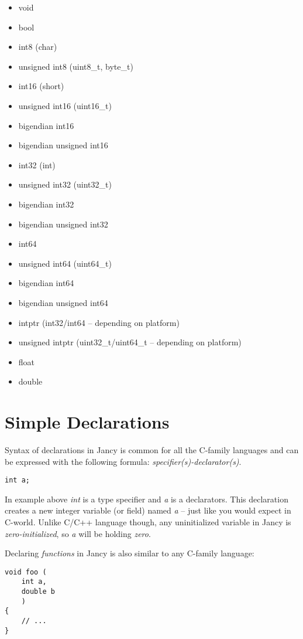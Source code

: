 \documentclass[oneside]{book}
\begin{document}
\begin{itemize}
\item void
\item bool
\item int8 (char)
\item unsigned int8 (uint8\_t, byte\_t)
\item int16 (short)
\item unsigned int16 (uint16\_t)
\item bigendian int16
\item bigendian unsigned int16 
\item int32 (int)
\item unsigned int32 (uint32\_t)
\item bigendian int32
\item bigendian unsigned int32
\item int64
\item unsigned int64 (uint64\_t)
\item bigendian int64
\item bigendian unsigned int64
\item intptr (int32/int64 -- depending on platform)
\item unsigned intptr (uint32\_t/uint64\_t -- depending on platform)
\item float
\item double
\end{itemize}

\section{Simple Declarations}

Syntax of declarations in Jancy is common for all the C-family languages and can be expressed with the following formula: \emph{specifier(s)-declarator(s)}.

\begin{lstlisting}
int a;
\end{lstlisting}

In example above \emph{int} is a type specifier and \emph{a} is a declarators. This declaration creates a new integer variable (or field) named \emph{a} -- just like you would expect in C-world. Unlike C/C++ language though, any uninitialized variable in Jancy is \emph{zero-initialized}, so \emph{a} will be holding \emph{zero}.

Declaring \emph{functions} in Jancy is also similar to any C-family language:

\begin{lstlisting}
void foo (
    int a, 
    double b
    )
{
    // ...
}
\end{lstlisting}
\end{document}
